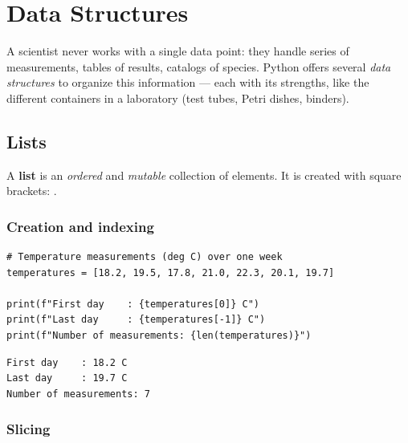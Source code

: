 \chapter{Data Structures}
\label{ch:structures}

\begin{intuition}
A scientist never works with a single data point: they handle series of
measurements, tables of results, catalogs of species. Python offers several
\emph{data structures} to organize this information --- each with its strengths,
like the different containers in a laboratory (test tubes, Petri dishes,
binders).
\end{intuition}

\section{Lists}

\begin{definition}[List]
A \textbf{list} is an \emph{ordered} and \emph{mutable} collection of elements.
It is created with square brackets: \py{[e1, e2, ...]}.
\end{definition}

\subsection{Creation and indexing}

\begin{codeblock}[title=\textbf{Python}]
\begin{verbatim}
# Temperature measurements (deg C) over one week
temperatures = [18.2, 19.5, 17.8, 21.0, 22.3, 20.1, 19.7]

print(f"First day    : {temperatures[0]} C")
print(f"Last day     : {temperatures[-1]} C")
print(f"Number of measurements: {len(temperatures)}")
\end{verbatim}
\end{codeblock}

\begin{codeoutput}
\begin{verbatim}
First day    : 18.2 C
Last day     : 19.7 C
Number of measurements: 7
\end{verbatim}
\end{codeoutput}

\subsection{Slicing}

